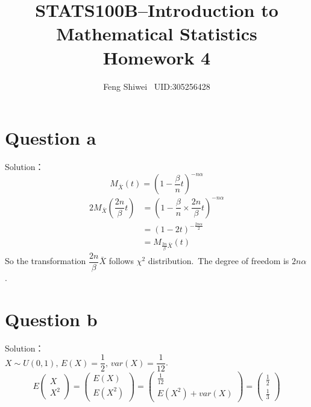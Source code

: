 \documentclass[a4papers]{ctexart}
\title{STATS100B--Introduction to Mathematical Statistics \\Homework 4}
\author{Feng Shiwei \ UID:305256428}
\date{}
\begin{document}
\maketitle
\section*{Question a}
\noindent Solution：\\
\indent 
\[M_{\bar{X}}\left( t\right) =\left( 1-\dfrac {\beta }{n}t\right) ^{-n\alpha }\]
\begin{alignat*}{2}
    M_{\bar {X}}\left( \dfrac {2n}{\beta }t\right) &=\left( 1-\dfrac {\beta }{n}\times \dfrac {2n}{\beta }t\right) ^{-n\alpha } \\
    &= \left(1-2t\right)^{-\frac{2n\alpha}{2}}\\
    &= M_{\frac{2n}{\beta}\bar{X}}(t)
\end{alignat*}
So the transformation $\dfrac{2n}{\beta}\bar{X}$ follows $\chi^2$ distribution.\, The degree of freedom is $2n\alpha$. 

\section*{Question b}
\noindent  Solution：\\
$X\sim U(0,1),\,E(X)=\dfrac{1}{2},\,var(X)=\dfrac{1}{12}$.\\
\[E\begin{pmatrix}X \\ X^2 \end{pmatrix} = \begin{pmatrix}E(X) \\ E(X^2) \end{pmatrix}
    = \begin{pmatrix}\frac{1}{12} \\ E(X^2)+var(X) \end{pmatrix}
    = \begin{pmatrix}\frac{1}{2} \\ \frac{1}{3} \end{pmatrix}\]
\end{document}
